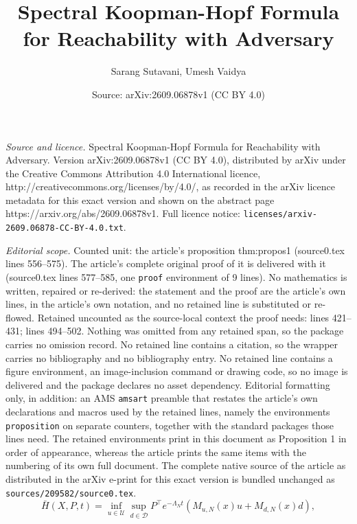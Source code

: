 \documentclass[10pt,a4paper]{amsart}
\title{\LARGE Spectral Koopman-Hopf Formula for Reachability with Adversary}
\author{Sarang Sutavani, Umesh Vaidya}
\date{Source: arXiv:2609.06878v1 (CC BY 4.0)}
\begin{document}
\maketitle

\noindent\emph{Source and licence.} \LARGE Spectral Koopman-Hopf Formula for Reachability with Adversary. Version arXiv:2609.06878v1 (CC BY 4.0), distributed by arXiv under the Creative Commons Attribution 4.0 International licence, http://creativecommons.org/licenses/by/4.0/, as recorded in the arXiv licence metadata for this exact version and shown on the abstract page https://arxiv.org/abs/2609.06878v1. Full licence notice: \texttt{licenses/arxiv-2609.06878-CC-BY-4.0.txt}.\par\smallskip

\noindent\textit{Editorial scope.} Counted unit: the article's proposition thm:propos1 (source0.tex lines 556--575). The article's complete original proof of it is delivered with it (source0.tex lines 577--585, one \texttt{proof} environment of 9 lines). No mathematics is written, repaired or re-derived: the statement and the proof are the article's own lines, in the article's own notation, and no retained line is substituted or re-flowed.  Retained uncounted as the source-local context the proof needs: lines 421--431; lines 494--502.  Nothing was omitted from any retained span, so the package carries no omission record.  No retained line contains a citation, so the wrapper carries no bibliography and no bibliography entry.  No retained line contains a figure environment, an image-inclusion command or drawing code, so no image is delivered and the package declares no asset dependency.  Editorial formatting only, in addition: an AMS \texttt{amsart} preamble that restates the article's own declarations and macros used by the retained lines, namely the environments \texttt{proposition} on separate counters, together with the standard packages those lines need.  The retained environments print in this document as Proposition 1 in order of appearance, whereas the article prints the same items with the numbering of its own full document.  The complete native source of the article as distributed in the arXiv e-print for this exact version is bundled unchanged as \texttt{sources/209582/source0.tex}.
\begin{equation}
    \bar H(X,P,t)
    =
    \inf_{u\in\mathcal U}
    \sup_{d\in\mathcal D}
    P^\top e^{-\Lambda_N t}
    \left(
    M_{u,N}(x)u + M_{d,N}(x)d
    \right),
    \label{eq:Hbar_general}
\end{equation}
\end{document}

